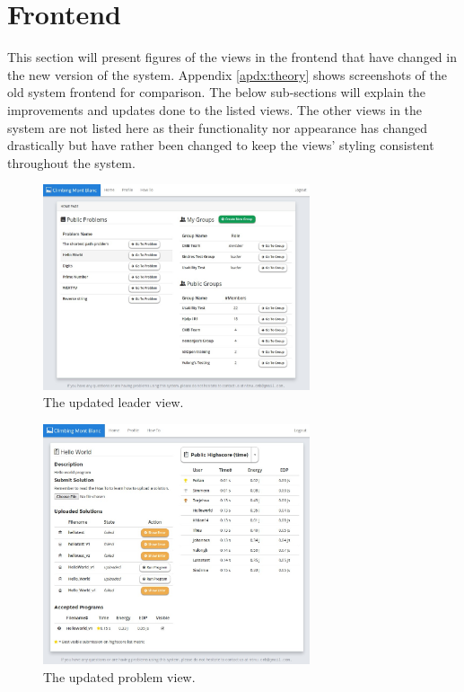 \section{Frontend}
\label{sec:impr-frontend}
This section will present figures of the views in the frontend that have changed in the new version of the system. Appendix \ref{apdx:theory} shows screenshots of the old system frontend for comparison. The below sub-sections will explain the improvements and updates done to the listed views. The other views in the system are not listed here as their functionality nor appearance has changed drastically but have rather been changed to keep the views’ styling consistent throughout the system.

\begin{figure}[h!]
    \centering
    \includegraphics[width=0.7\textwidth]{figs/new_homepage.jpg}
    \caption[The updated leader view]{The updated leader view.}
    \label{fig:new-homepage}
\end{figure}

\begin{figure}[h!]
    \centering
    \includegraphics[width=0.7\textwidth]{figs/new_problem.jpg}
    \caption[The updated problem view]{The updated problem view.}
    \label{fig:new-problem}
\end{figure}

